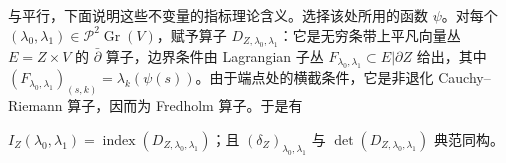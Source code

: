 与平行，下面说明这些不变量的指标理论含义。选择该处所用的函数 $\psi$。对每个 $(\lambda_0,\allowbreak \lambda_1)\in\mathcal P^2\operatorname{Gr}(V)$，赋予算子 $D_{Z,\allowbreak \lambda_0,\allowbreak \lambda_1}$：它是无穷条带上平凡向量丛 $E=Z\times V$ 的 $\bar\partial$ 算子，边界条件由 Lagrangian 子丛 $F_{\lambda_0,\allowbreak \lambda_1}\subset E|\partial Z$ 给出，其中 $(F_{\lambda_0,\allowbreak \lambda_1})_{(s,\allowbreak k)}=\lambda_k(\psi(s))$。由于端点处的横截条件，它是非退化 Cauchy–Riemann 算子，因而为 Fredholm 算子。于是有
\begin{lemma}\label{st:11.9}
$I_Z(\lambda_0,\allowbreak \lambda_1)=\operatorname{index}(D_{Z,\allowbreak \lambda_0,\allowbreak \lambda_1})$；且 $(\delta_Z)_{\lambda_0,\allowbreak \lambda_1}$ 与 $\det(D_{Z,\allowbreak \lambda_0,\allowbreak \lambda_1})$ 典范同构。
\end{lemma}
